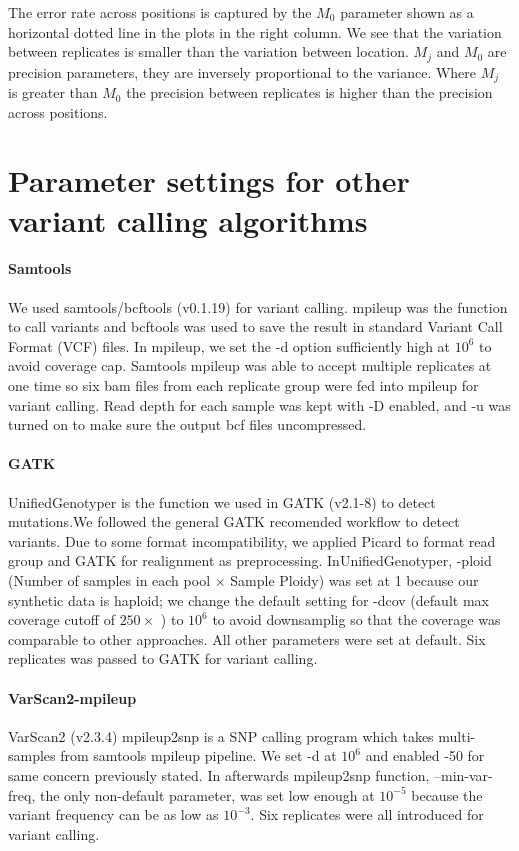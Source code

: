 \documentclass[11pt,reqno]{amsart}
\begin{document}
The error rate across positions is captured by the $M_0$ parameter shown as a horizontal dotted line in the plots in the right column. We see that the variation between replicates is smaller than the variation between location. $M_j$ and $M_0$ are precision parameters, they are inversely proportional to the variance. Where $M_j$ is greater than $M_0$ the precision between replicates is higher than the precision across positions.


\section{Parameter settings for other variant calling algorithms}

\paragraph{\textbf{Samtools}}We used samtools/bcftools (v0.1.19) for variant calling. mpileup was the function to call variants and bcftools was used to save the result in standard Variant Call Format (VCF) files. In mpileup, we set the -d option sufficiently high at $10^6$ to avoid coverage cap.  Samtools mpileup was able to accept multiple replicates at one time so six bam files from each replicate group were fed into mpileup for variant calling. Read depth for each sample was kept with -D enabled, and -u was turned on to make sure the output bcf files uncompressed. 

\paragraph{\textbf{GATK}}
UnifiedGenotyper is the function we used in GATK (v2.1-8) to detect mutations.We followed the general GATK recomended workflow to detect variants. Due to some format  incompatibility, we applied Picard to format read group and GATK for realignment as preprocessing. InUnifiedGenotyper, -ploid (Number of samples in each pool $\times$ Sample Ploidy) was set at 1 because our synthetic data is haploid; we change the default setting for -dcov (default max coverage cutoff of $250\times$ ) to $10^6$ to avoid downsamplig so that the coverage was comparable to other approaches. All other parameters were set at default. Six replicates was passed to GATK for variant calling.

\paragraph{\textbf{VarScan2-mpileup}}
VarScan2 (v2.3.4) mpileup2snp is a SNP calling program which takes multi-samples from samtools mpileup pipeline. We set -d at $10^6$ and enabled -50 for same concern previously stated. In afterwards mpileup2snp function, --min-var-freq, the only non-default parameter, was set low enough at $10^{-5}$ because the variant frequency can be as low as $10^{-3}$. Six replicates were all introduced for variant calling.
\end{document}
